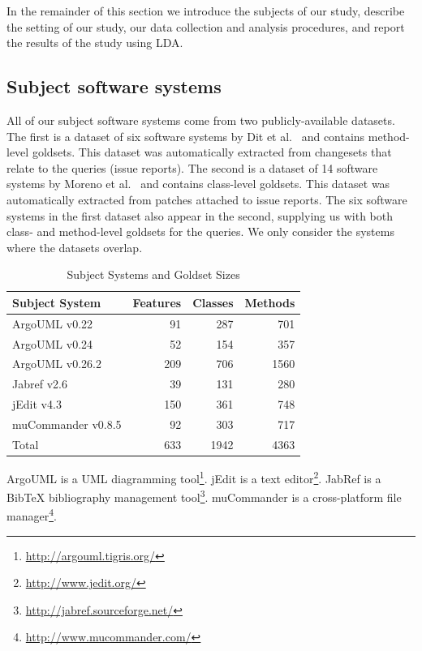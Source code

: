 In the remainder of this section we introduce the subjects of our study,
describe the setting of our study, our data collection and analysis procedures,
and report the results of the study using LDA.


\subsection{Subject software systems}

All of our subject software systems come from two publicly-available datasets.
The first is a dataset of six software systems by Dit et al.~\cite{Dit-etal:2013} and contains method-level goldsets.
This dataset was automatically extracted from changesets that relate to the queries (issue reports).
The second is a dataset of 14 software systems by Moreno et al.~\cite{Moreno-etal:2014} and contains class-level goldsets.
This dataset was automatically extracted from patches attached to issue reports.
The six software systems in the first dataset also appear in the second,
supplying us with both class- and method-level goldsets for the queries.
We only consider the systems where the datasets overlap.

\begin{table}[t]
\renewcommand{\arraystretch}{1.3}
\footnotesize
\centering
\caption{Subject Systems and Goldset Sizes}
\begin{tabular}{lrrr}
    \toprule
    Subject System     & Features & Classes & Methods \\
    \midrule
    ArgoUML v0.22      & 91       & 287     & 701     \\
    ArgoUML v0.24      & 52       & 154     & 357     \\
    ArgoUML v0.26.2    & 209      & 706     & 1560    \\
    Jabref v2.6        & 39       & 131     & 280     \\
    jEdit v4.3         & 150      & 361     & 748     \\
    muCommander v0.8.5 & 92       & 303     & 717     \\
    \midrule
    Total              & 633      & 1942    & 4363    \\
    \bottomrule
\end{tabular}
\label{table:subjects}
\end{table}

ArgoUML is a UML diagramming tool\footnote{\url{http://argouml.tigris.org/}}.
jEdit is a text editor\footnote{\url{http://www.jedit.org/}}.
JabRef is a BibTeX bibliography management tool\footnote{\url{http://jabref.sourceforge.net/}}.
muCommander is a cross-platform file manager\footnote{\url{http://www.mucommander.com/}}.


